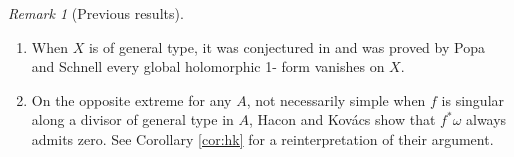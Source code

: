 \documentclass[11pt,reqno]{amsart}
\theoremstyle{definition}
\theoremstyle{remark}
\newtheorem{remark}[theorem]{Remark}
\theoremstyle{cited}
\theoremstyle{citeddef}
\begin{document}
\begin{remark}[Previous results]
\begin{enumerate}
\item \label{item:ps} When $X$ is of general type, it was conjectured in
	\cite{HK05, LZ05} and was proved
	by Popa and Schnell \cite{PS14} every global holomorphic 1-		
	form vanishes on $X$. 
\item \label{item:hk} On the opposite extreme for any $A$, not necessarily simple when $f$ is singular along a divisor of general
		type in $A$, Hacon and Kov\'acs \cite[Proposition 3.5.]{HK05} show that
		$f^*\omega$ always admits zero. See Corollary \ref{cor:hk}
		for a reinterpretation of their argument. 
\end{enumerate}
\end{remark}
\end{document}

